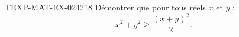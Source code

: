 \begin{exercice}{TEXP-MAT-EX-024}{2}{18}
Démontrer que pour tous réels $x$ et $y$ :
\[ x^2 + y^2 \geq \frac{(x+y)^2}{2}. \]

\end{exercice}
